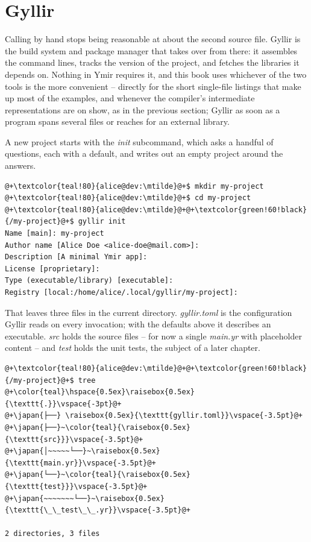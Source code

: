 \section{Gyllir}
\label{sec:basics:gyllir}

Calling  by hand stops being reasonable at about the second source
file. Gyllir is the build system and package manager that takes over from there:
it assembles the command lines, tracks the version of the project, and fetches
the libraries it depends on. Nothing in Ymir requires it, and this book uses
whichever of the two tools is the more convenient --  directly for the
short single-file listings that make up most of the examples, and whenever the
compiler's intermediate representations are on show, as in the previous section;
Gyllir as soon as a program spans several files or reaches for an external
library.

A new project starts with the \textit{init} subcommand, which asks a handful of
questions, each with a default, and writes out an empty project around the
answers.

\begin{lstlisting}[style=bashVerb, escapechar=@+]
@+\textcolor{teal!80}{alice@dev:\mtilde}@+$ mkdir my-project
@+\textcolor{teal!80}{alice@dev:\mtilde}@+$ cd my-project
@+\textcolor{teal!80}{alice@dev:\mtilde}@+@+\textcolor{green!60!black}{/my-project}@+$ gyllir init
Name [main]: my-project
Author name [Alice Doe <alice-doe@mail.com>]:
Description [A minimal Ymir app]:
License [proprietary]:
Type (executable/library) [executable]:
Registry [local:/home/alice/.local/gyllir/my-project]:
\end{lstlisting}

That leaves three files in the current directory.
\textit{gyllir.toml} is the configuration Gyllir reads on every invocation; with
the defaults above it describes an executable. \textit{src} holds the source
files -- for now a single \textit{main.yr} with placeholder content -- and
\textit{test} holds the unit tests, the subject of a later chapter.

\begin{lstlisting}[style=bashVerb, escapechar=@+]
@+\textcolor{teal!80}{alice@dev:\mtilde}@+@+\textcolor{green!60!black}{/my-project}@+$ tree
@+\color{teal}\hspace{0.5ex}\raisebox{0.5ex}{\texttt{.}}\vspace{-3pt}@+
@+\japan{├──} \raisebox{0.5ex}{\texttt{gyllir.toml}}\vspace{-3.5pt}@+
@+\japan{├──}~\color{teal}{\raisebox{0.5ex}{\texttt{src}}}\vspace{-3.5pt}@+
@+\japan{│~~~~~└──}~\raisebox{0.5ex}{\texttt{main.yr}}\vspace{-3.5pt}@+
@+\japan{└──}~\color{teal}{\raisebox{0.5ex}{\texttt{test}}}\vspace{-3.5pt}@+
@+\japan{~~~~~~~└──}~\raisebox{0.5ex}{\texttt{\_\_test\_\_.yr}}\vspace{-3.5pt}@+

2 directories, 3 files
\end{lstlisting}

